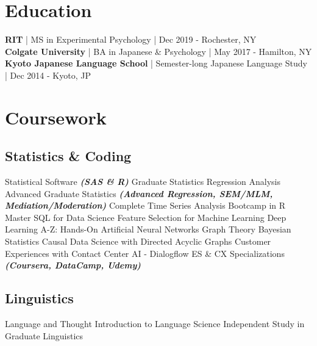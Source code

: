 \documentclass[letterpaper]{deedy-resume_sm} %
\begin{document}
\section{Education} 
\textbf{RIT} | MS in Experimental Psychology | Dec 2019 - Rochester, NY\\
\sectionspace %
\textbf{Colgate University} | BA in Japanese \& Psychology | May 2017 - Hamilton, NY\\
\sectionspace %
\textbf{Kyoto Japanese Language School} | Semester-long Japanese Language Study | Dec 2014 - Kyoto, JP\\
\sectionspace %

\section{Coursework}
\subsection{Statistics \& Coding}
Statistical Software \textbullet{} 
{\footnotesize \textit{\textbf{(SAS \& R) }}} \textbullet{} 
Graduate Statistics \textbullet{} 
Regression Analysis \textbullet{} 
Advanced Graduate Statistics \textbullet{} 
{\footnotesize \textit{\textbf{(Advanced Regression, SEM/MLM, Mediation/Moderation)}}}
\textbullet{} Complete Time Series Analysis Bootcamp in R \textbullet{} Master SQL for Data Science \textbullet{} Feature Selection for Machine Learning \textbullet{} Deep Learning A-Z: Hands-On Artificial Neural Networks \textbullet{} Graph Theory \textbullet{} Bayesian Statistics \textbullet{} Causal Data Science with Directed Acyclic Graphs \textbullet{} Customer Experiences with Contact Center AI - Dialogflow ES \& CX Specializations {\footnotesize \textit{\textbf{(Coursera, DataCamp, Udemy)}}}
\sectionspace
\subsection{Linguistics}
Language and Thought \textbullet{} 
Introduction to Language Science \textbullet{} 
Independent Study in Graduate Linguistics \textbullet{} 
\sectionspace
\end{document}
